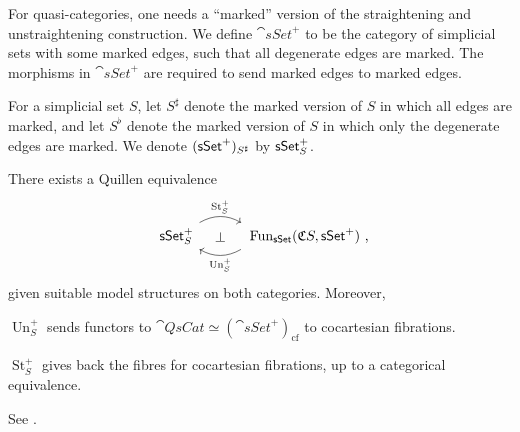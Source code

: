 For quasi-categories, one needs a ``marked'' version
of the straightening and unstraightening construction.
We define $\cat{sSet}^+$ to be the category of simplicial sets 
with some marked edges, such that all degenerate edges are marked.
The morphisms in $\cat{sSet}^+$ are required to send marked edges to marked edges.

For a simplicial set $S$, let $S^\sharp$ denote 
the marked version of $S$ in which all edges are marked,
and let $S^\flat$ denote the marked version of $S$
in which only the degenerate edges are marked.
We denote $(\textup{\textsf{sSet}}^+)_{\/{S^\sharp}}$ by $\textup{\textsf{sSet}}^+_{\/S}$.

\begin{theorem}
    There exists a Quillen equivalence
    \[\begin{tikzcd}[column sep=3em]
        \cat{sSet}^+_{\/S}\ar[r,bend left,start anchor=north east,end anchor=north west,"\operatorname{St}_S^+"]
        \ar[r,phantom,"\bot"] &
        \vphantom{\cat{sSet}^+_{\/S}}
        \operatorname{Fun}_{\cat{sSet}}(\mathfrak CS,\cat{sSet}^+)\rlap{\ ,}
        \ar[l,bend left,start anchor=south west,end anchor=south east,"\operatorname{Un}_S^+"]
    \end{tikzcd}\]
    given suitable model structures on both categories.
    Moreover, 
    \begin{itms}
        \item $\operatorname{Un}_S^+$ sends functors to
        $\cat{QsCat}\simeq(\cat{sSet}^+)_{\mathrm{cf}}$
        to cocartesian fibrations.
        \item $\operatorname{St}_S^+$ gives back the fibres
        for cocartesian fibrations,
        up to a categorical equivalence.
    \end{itms}
\end{theorem}

See \cite[Theorem~3.2.0.1]{htt}.

